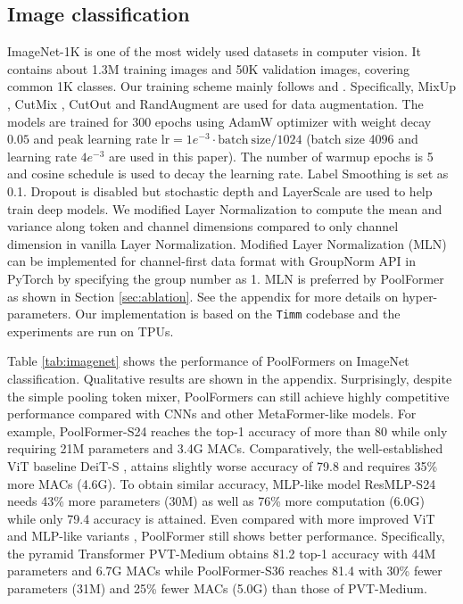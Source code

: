 \subsection{Image classification}
ImageNet-1K \cite{imagenet} is one of the most widely used datasets in computer vision. It contains about 1.3M training images and 50K validation images, covering common 1K classes. Our training scheme mainly follows \cite{deit} and \cite{cait}. Specifically, MixUp \cite{mixup}, CutMix \cite{cutmix}, CutOut \cite{cutout} and RandAugment \cite{randaugment} are used for data augmentation. The models are trained for 300 epochs using AdamW optimizer \cite{adam, adamw} with weight decay $0.05$ and peak learning rate $\mathrm{lr} = 1e^{-3} \cdot \mathrm{batch\ size} / 1024$ (batch size 4096 and learning rate $4e^{-3}$ are used in this paper). The number of warmup epochs is 5 and cosine schedule is used to decay the learning rate. Label Smoothing \cite{label_smoothing} is set as 0.1. Dropout is disabled but stochastic depth \cite{stochastic_depth} and LayerScale \cite{cait} are used to help train deep models. 
We modified Layer Normalization \cite{layer_norm} to compute the mean and variance along token and channel dimensions compared to only channel dimension in vanilla Layer Normalization. Modified Layer Normalization (MLN) can be implemented for channel-first data format with GroupNorm API in PyTorch by specifying the group number as 1. MLN is preferred by PoolFormer as shown in Section \ref{sec:ablation}. See the appendix for more details on hyper-parameters. Our implementation is based on the \texttt{Timm} codebase \cite{timm} and the experiments are run on TPUs. 


Table \ref{tab:imagenet} shows the performance of PoolFormers on ImageNet classification. Qualitative results are shown in the appendix. Surprisingly, despite the simple pooling token mixer, PoolFormers can still achieve highly competitive performance compared with CNNs and other MetaFormer-like models. For example, PoolFormer-S24 reaches the top-1 accuracy of more than 80 while only requiring 21M parameters and 3.4G MACs. Comparatively, the well-established ViT baseline DeiT-S \cite{deit}, attains slightly worse accuracy of 79.8 and requires 35\% more MACs (4.6G). To obtain similar accuracy, MLP-like model ResMLP-S24 \cite{resmlp} needs 43\% more parameters (30M) as well as 76\% more computation (6.0G) while only 79.4 accuracy is attained. Even compared with more improved ViT and MLP-like variants \cite{pvt, gmlp}, PoolFormer still shows better performance. Specifically, the pyramid Transformer PVT-Medium obtains 81.2 top-1 accuracy with 44M parameters and 6.7G MACs while PoolFormer-S36 reaches 81.4 with 30\% fewer parameters (31M) and 25\% fewer MACs (5.0G) than those of PVT-Medium. 


